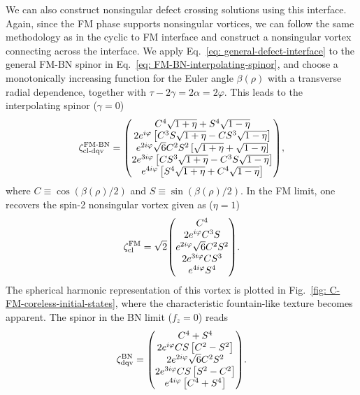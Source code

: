 We can also construct nonsingular defect crossing solutions using this interface.
Again, since the FM phase supports nonsingular vortices, we can follow
the same methodology as in the cyclic to FM interface and construct a
nonsingular vortex connecting across the interface.
We apply Eq.~\eqref{eq: general-defect-interface} to the general FM-BN spinor
in Eq.~\eqref{eq: FM-BN-interpolating-spinor}, and choose a monotonically
increasing function for the Euler angle \(\beta(\rho)\) with a transverse
radial dependence, together with \(\tau - 2\gamma = 2\alpha = 2\varphi \).
This leads to the interpolating spinor
(\(\gamma=0\))
\begin{align}\label{eq: FM-BN-coreless-dqv}
    \zeta^\text{FM-BN}_\text{cl-dqv} = \mqty(
    C^4\sqrt{1+\eta} + S^4\sqrt{1-\eta} \\
    2e^{i\varphi}\left[C^3S\sqrt{1+\eta}
        - CS^3\sqrt{1-\eta}\right] \\
    e^{2i\varphi}\sqrt{6}C^2S^2\left[\sqrt{1+\eta}
        + \sqrt{1-\eta} \right] \\
    2e^{3i\varphi}\left[CS^3\sqrt{1+\eta}
        - C^3S\sqrt{1-\eta}\right] \\
    e^{4i\varphi}\left[S^4\sqrt{1+\eta} + C^4\sqrt{1-\eta} \right]
    ),
\end{align}
where \(C \equiv \cos(\beta(\rho)/2)\) and \(S \equiv \sin(\beta(\rho)/2)\).
In the FM limit, one recovers the spin-2 nonsingular vortex given as
(\(\eta=1\))
\begin{align}\label{eq: FM-BN-coreless}
    \zeta^\text{FM}_\text{cl} = \sqrt{2}\mqty(C^4 \\ 2e^{i\varphi}C^3S \\
    e^{2i\varphi}\sqrt{6}C^2S^2 \\ 2e^{3i\varphi}CS^3 \\ e^{4i\varphi}S^4
    ).
\end{align}
The spherical harmonic representation of this vortex is plotted in
Fig.~\ref{fig: C-FM-coreless-initial-states}, where the characteristic
fountain-like texture becomes apparent.
The spinor in the BN limit (\(f_z=0\)) reads
\begin{align}\label{eq: FM-BN-DQV}
    \zeta^\text{BN}_\text{dqv} = \mqty(
    C^4 + S^4 \\
    2e^{i\varphi}CS\left[C^2-S^2\right] \\
    2e^{2i\varphi}\sqrt{6}C^2S^2 \\
    2e^{3i\varphi}CS\left[S^2 - C^2\right] \\
    e^{4i\varphi}\left[C^4 + S^4\right]).
\end{align}
